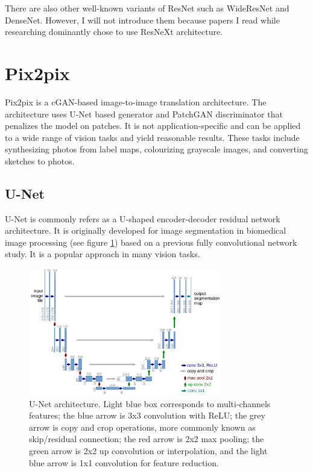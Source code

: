 There are also other well-known variants of ResNet such as WideResNet and DenseNet. However, I will not introduce them because papers I read while researching dominantly chose to use ResNeXt architecture.



\section{Pix2pix}
Pix2pix is a cGAN-based image-to-image translation architecture. The architecture uses U-Net based generator and PatchGAN discriminator that penalizes the model on patches. It is not application-specific and can be applied to a wide range of vision tasks and yield reasonable results. These tasks include synthesizing photos from label maps, colourizing grayscale images, and converting sketches to photos.

\subsection{U-Net}
U-Net\cite{ronnebergerUNetConvolutionalNetworks2015} is commonly refers as a U-shaped encoder-decoder residual network architecture. It is originally developed for image segmentation in biomedical image processing (see figure \ref{fig:unet_arch}) based on a previous fully convolutional network study\cite{longFullyConvolutionalNetworks2015}. It is a popular approach in many vision tasks.

\begin{figure}
    \centering
    \includegraphics[width=0.75\textwidth]{images/preliminary/unet_arch.png}
    \caption[U-Net architecture.]{U-Net architecture. Light blue box corresponds to multi-channels features; the blue arrow is 3x3 convolution with ReLU; the grey arrow is copy and crop operations, more commonly known as skip/residual connection; the red arrow is 2x2 max pooling; the green arrow is 2x2 up convolution or interpolation, and the light blue arrow is 1x1 convolution for feature reduction.\cite{ronnebergerUNetConvolutionalNetworks2015}} 
    \label{fig:unet_arch}
\end{figure}

